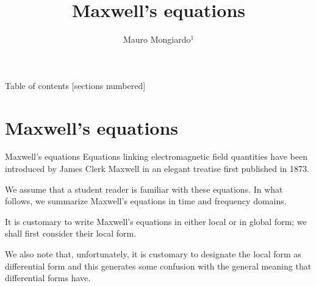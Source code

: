 \documentclass[handout,10pt]{beamer}
\title{Maxwell's equations}
\date{}
\author{ Mauro Mongiardo$^1$}
\institute{
 $^1$ Department of Engineering, University of Perugia, Perugia, Italy.
}
\begin{document}
\maketitle

\begin{frame}{Table of contents}
  [sections numbered]
  \tableofcontents[hideallsubsections]
\end{frame}

\section{Maxwell's equations}

\begin{frame}[fragile]{Maxwell's equations}
Equations linking electromagnetic field quantities have been
introduced by \alert{James Clerk Maxwell}  in an
elegant treatise first published in \alert{1873}.

\pause
 We assume that a student reader is familiar with
these equations. In what
follows, we summarize Maxwell's equations in \alert{time and frequency} domains.

\pause

It is customary to write \alert{Maxwell's equations} in either \alert{local or in global form}; we shall first consider
their local form. 

\pause
We also note that, unfortunately, it is customary
to designate the local form as differential form and this generates
some confusion with the general meaning that differential forms
have. 

\end{frame}
\end{document}
